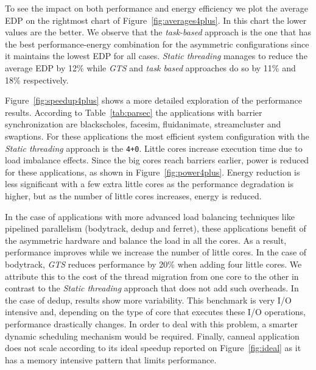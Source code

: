 To see the impact on both performance and energy efficiency we plot the average EDP on the 
rightmost chart of Figure~\ref{fig:averages4plus}. In this chart the lower values are the better. We 
observe that the \emph{task-based} approach is the one that has the best performance-energy 
combination for the asymmetric configurations since it maintains the lowest EDP for all cases. 
\emph{Static threading} manages to reduce the average EDP by 12\% while \emph{GTS} and \emph{task 
based} approaches do so by 11\% and 18\% respectively.

Figure~\ref{fig:speedup4plus} shows a more detailed exploration of the performance results. 
According to Table~\ref{tab:parsec} the applications with barrier synchronization are blackscholes, 
facesim, fluidanimate, streamcluster and swaptions. For these applications the most efficient system 
configuration with the \emph{Static threading} approach is the \texttt{4+0}. Little cores increase 
execution time due to load imbalance effects. Since the big cores reach barriers earlier, power is 
reduced for these applications, as shown in Figure~\ref{fig:power4plus}. Energy reduction is less 
significant with a few extra little cores as the performance degradation is higher, but as the 
number of little cores increases, energy is reduced. 

In the case of applications with more advanced load balancing techniques like pipelined 
parallelism (bodytrack, dedup and ferret), these applications benefit of the asymmetric 
hardware and balance the load in all the cores. As a result, performance improves while we increase 
the number of little cores. In the case of bodytrack, \emph{GTS} reduces performance by 20\% when 
adding four little cores. We attribute this to the cost of the thread migration from one core to the 
other in contrast to the \emph{Static threading} approach that does not add such overheads. 
In the case of dedup, results show more variability. This benchmark is very I/O intensive and, depending on the type of core that executes these I/O operations, performance drastically changes. In order to deal with this problem, a smarter dynamic scheduling mechanism would be required. Finally, canneal application does not 
scale according to its ideal speedup reported on Figure~\ref{fig:ideal} as it has a memory intensive 
pattern that limits performance.

